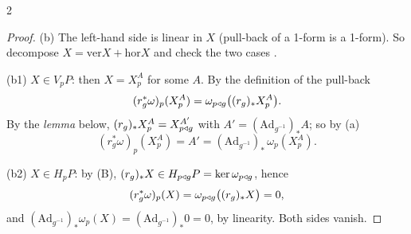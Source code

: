 \begin{paracol}{2}
\begin{proof}
(b) The left-hand side is linear in $X$ (pull-back of a 1-form is a 1-form). So decompose $X=\mathrm{ver}X+\mathrm{hor}X$ and check the two cases   .

(b1) $X\in V_pP$: then $X=X^A_p$ for some $A$. By the definition of the pull-back
\[
  (r_g^*\omega)_p(X^A_p)=\omega_{p\mathbin{\triangleleft} g}\bigl((r_g)_*X^A_p\bigr).
\]
By the \emph{lemma} below, $(r_g)_*X^A_p=X^{A'}_{p\mathbin{\triangleleft} g}$ with $A'=(\mathrm{Ad}_{g^{-1}})_*A$; so by (a)
\[
  (r_g^*\omega)_p(X^A_p)=A'=(\mathrm{Ad}_{g^{-1}})_*\,\omega_p(X^A_p).
\]
            

(b2) $X\in H_pP$: by (B), $(r_g)_*X\in H_{p\mathbin{\triangleleft} g}P=\ker\omega_{p\mathbin{\triangleleft} g}$, hence
\[
  (r_g^*\omega)_p(X)=\omega_{p\mathbin{\triangleleft} g}\bigl((r_g)_*X\bigr)=0 ,
\]
and $(\mathrm{Ad}_{g^{-1}})_*\omega_p(X)=(\mathrm{Ad}_{g^{-1}})_*0=0$, by linearity. Both sides vanish.           


\end{proof}
\end{paracol}
